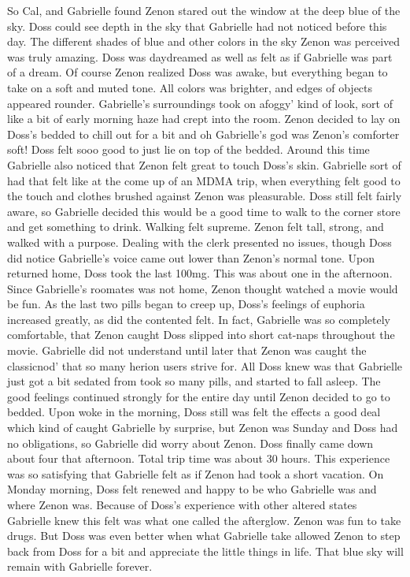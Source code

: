 \documentclass[12pt]{book}
\begin{document}
So Cal, and Gabrielle found Zenon stared out the window at the deep blue of the sky. Doss could see depth in the sky that Gabrielle had not noticed before this day. The different shades of blue and other colors in the sky Zenon was perceived was truly amazing. Doss was daydreamed as well as felt as if Gabrielle was part of a dream. Of course Zenon realized Doss was awake, but everything began to take on a soft and muted tone. All colors was brighter, and edges of objects appeared rounder. Gabrielle's surroundings took on afoggy' kind of look, sort of like a bit of early morning haze had crept into the room. Zenon decided to lay on Doss's bedded to chill out for a bit and oh Gabrielle's god was Zenon's comforter soft! Doss felt sooo good to just lie on top of the bedded. Around this time Gabrielle also noticed that Zenon felt great to touch Doss's skin. Gabrielle sort of had that felt like at the come up of an MDMA trip, when everything felt good to the touch and clothes brushed against Zenon was pleasurable. Doss still felt fairly aware, so Gabrielle decided this would be a good time to walk to the corner store and get something to drink. Walking felt supreme. Zenon felt tall, strong, and walked with a purpose. Dealing with the clerk presented no issues, though Doss did notice Gabrielle's voice came out lower than Zenon's normal tone. Upon returned home, Doss took the last 100mg. This was about one in the afternoon. Since Gabrielle's roomates was not home, Zenon thought watched a movie would be fun. As the last two pills began to creep up, Doss's feelings of euphoria increased greatly, as did the contented felt. In fact, Gabrielle was so completely comfortable, that Zenon caught Doss slipped into short cat-naps throughout the movie. Gabrielle did not understand until later that Zenon was caught the classicnod' that so many herion users strive for. All Doss knew was that Gabrielle just got a bit sedated from took so many pills, and started to fall asleep. The good feelings continued strongly for the entire day until Zenon decided to go to bedded. Upon woke in the morning, Doss still was felt the effects a good deal which kind of caught Gabrielle by surprise, but Zenon was Sunday and Doss had no obligations, so Gabrielle did worry about Zenon. Doss finally came down about four that afternoon. Total trip time was about 30 hours. This experience was so satisfying that Gabrielle felt as if Zenon had took a short vacation. On Monday morning, Doss felt renewed and happy to be who Gabrielle was and where Zenon was. Because of Doss's experience with other altered states Gabrielle knew this felt was what one called the afterglow. Zenon was fun to take drugs. But Doss was even better when what Gabrielle take allowed Zenon to step back from Doss for a bit and appreciate the little things in life. That blue sky will remain with Gabrielle forever.
\end{document}
